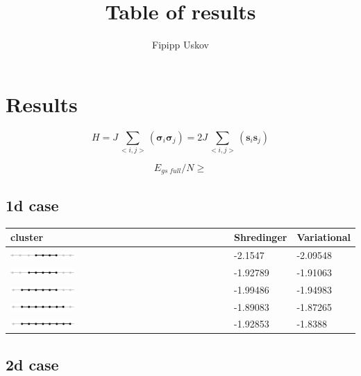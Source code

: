 \documentclass[11pt]{article} %
\title{Table of results}
\author{Fipipp Uskov}
\newcommand{\cc}{\bm{\sigma}}
\begin{document}
\maketitle

\section{Results}

$$ H=J\sum_{<i,j>}(\cc_i\cc_j) = 2J\sum_{<i,j>}(\bm{s}_i\bm{s}_j) $$

$$ E_{gs\;full}/N\geqslant $$

\subsection{1d case}

\begin{tabular}{|l|l|l|}
\hline
cluster & Shredinger & Variational \\
\hline
\includegraphics[width=0.3\textwidth]{line4.png} & -2.1547 & -2.09548 \\
\hline
\includegraphics[width=0.3\textwidth]{line5.png} & -1.92789 & -1.91063 \\
\hline
\includegraphics[width=0.3\textwidth]{line6.png} & -1.99486 & -1.94983 \\
\hline
\includegraphics[width=0.3\textwidth]{line7.png} & -1.89083 & -1.87265 \\
\hline
\includegraphics[width=0.3\textwidth]{line8.png} & -1.92853 & -1.8388 \\
\hline
\end{tabular}

\subsection{2d case}
\end{document}
